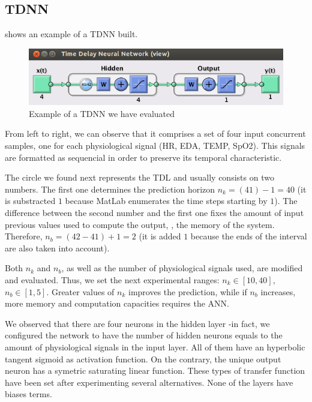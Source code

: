 \subsection{TDNN}
\label{subsec:tdnnapplication}

 shows an example of a TDNN built.
\begin{figure}[!ht]
\centering
\includegraphics[width=0.9\columnwidth]{images/results/tdnn}
\caption{Example of a TDNN we have evaluated}
\label{fig:tdnnbuilt}
\end{figure}

From left to right, we can observe that it comprises a set of four input concurrent samples, 
one for each physiological signal (HR, EDA, TEMP, SpO2). This signals are formatted as sequencial in order to preserve its temporal characteristic.

The circle we found next represents the TDL and usually consists on two numbers. The first one determines the prediction horizon $n_{k}=(41)-1=40$ (it is substracted $1$ because MatLab enumerates the time steps starting by $1$). The difference between the second number and the first one fixes the amount of input previous values used to compute the output, \ie, the memory of the system. Therefore, $n_{b}=(42-41)+1=2$ (it is added $1$ because the ends of the interval are also taken into account).

Both $n_{k}$ and $n_{b}$, as well as the number of physiological signals used, are modified and evaluated. Thus, we set the next experimental ranges: $n_{k}\in [10,40]$, $n_{b}\in [1,5]$. Greater values of $n_{k}$ improves the prediction, while if $n_{b}$ increases, more memory and computation capacities requires the ANN.

We observed that there are four neurons in the hidden layer -in fact, we configured the network to have the number of hidden neurons equals to the amount of physiological signals in the input layer. All of them have an hyperbolic tangent sigmoid as activation function. On the contrary, the unique output neuron has a symetric saturating linear function. These types of transfer function have been set after experimenting several alternatives. None of the layers have biases terms.

